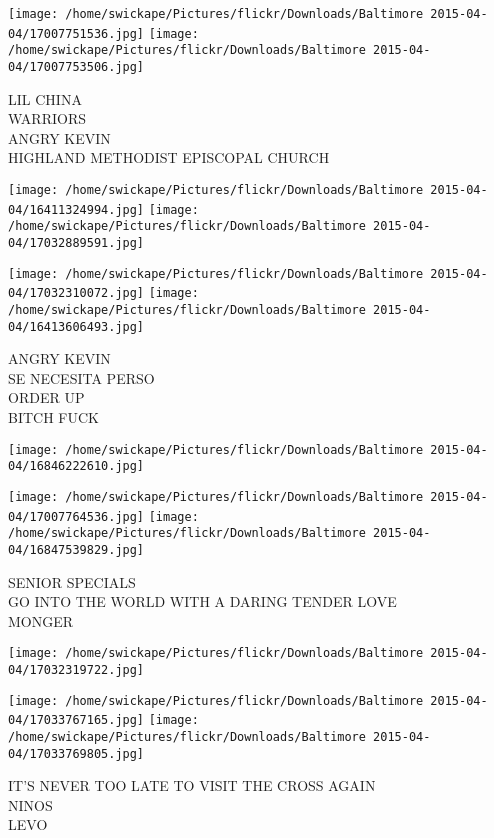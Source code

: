 \documentclass[10pt,letterpaper]{article}
\begin{document}
\texttt{[image: /home/swickape/Pictures/flickr/Downloads/Baltimore 2015-04-04/17007751536.jpg]}
\texttt{[image: /home/swickape/Pictures/flickr/Downloads/Baltimore 2015-04-04/17007753506.jpg]}

LIL CHINA\\
WARRIORS\\
ANGRY KEVIN\\
HIGHLAND METHODIST EPISCOPAL CHURCH\\
\pagebreak

\texttt{[image: /home/swickape/Pictures/flickr/Downloads/Baltimore 2015-04-04/16411324994.jpg]}
\texttt{[image: /home/swickape/Pictures/flickr/Downloads/Baltimore 2015-04-04/17032889591.jpg]}

\texttt{[image: /home/swickape/Pictures/flickr/Downloads/Baltimore 2015-04-04/17032310072.jpg]}
\texttt{[image: /home/swickape/Pictures/flickr/Downloads/Baltimore 2015-04-04/16413606493.jpg]}

ANGRY KEVIN\\
SE NECESITA PERSO\\
ORDER UP\\
BITCH FUCK\\
\pagebreak

\texttt{[image: /home/swickape/Pictures/flickr/Downloads/Baltimore 2015-04-04/16846222610.jpg]}

\vspace{0.25in}
\texttt{[image: /home/swickape/Pictures/flickr/Downloads/Baltimore 2015-04-04/17007764536.jpg]}
\texttt{[image: /home/swickape/Pictures/flickr/Downloads/Baltimore 2015-04-04/16847539829.jpg]}

SENIOR SPECIALS\\
GO INTO THE WORLD WITH A DARING TENDER LOVE\\
MONGER\\
\pagebreak

\texttt{[image: /home/swickape/Pictures/flickr/Downloads/Baltimore 2015-04-04/17032319722.jpg]}

\vspace{0.25in}
\texttt{[image: /home/swickape/Pictures/flickr/Downloads/Baltimore 2015-04-04/17033767165.jpg]}
\texttt{[image: /home/swickape/Pictures/flickr/Downloads/Baltimore 2015-04-04/17033769805.jpg]}

IT'S NEVER TOO LATE TO VISIT THE CROSS AGAIN\\
NINOS\\
LEVO\\
\pagebreak
\end{document}
